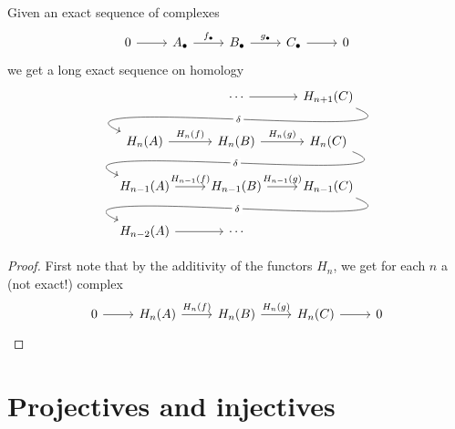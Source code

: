 \documentclass[main.tex]{subfiles}
\begin{document}
\begin{corollary}
  \label{cor:long_exact_sequence_on_homology}
  Given an exact sequence of complexes
  \begin{equation*}
    \begin{tikzcd}
      0
      \arrow[r]
      & A_{\bullet}
      \arrow[r, "f_{\bullet}"]
      & B_{\bullet}
      \arrow[r, "g_{\bullet}"]
      & C_{\bullet}
      \arrow[r]
      & 0
    \end{tikzcd}
  \end{equation*}
  we get a long exact sequence on homology
  \begin{equation*}
    \begin{tikzcd}
      & \cdots
      \arrow[r]
      & H_{n+1}(C)
      \\
      H_{n}(A)
      \arrow[from=urr, out=-22, in=157, looseness=1, overlay, "\delta" description]
      \arrow[r, "H_{n}(f)"]
      & H_{n}(B)
      \arrow[r, "H_{n}(g)"]
      & H_{n}(C)
      \\
      H_{n-1}(A)
      \arrow[from=urr, out=-22, in=157, looseness=1, overlay, "\delta" description]
      \arrow[r, "H_{n-1}(f)"]
      & H_{n-1}(B)
      \arrow[r, "H_{n-1}(g)"]
      & H_{n-1}(C)
      \\
      H_{n-2}(A)
      \arrow[from=urr, out=-22, in=157, looseness=1, overlay, "\delta" description]
      \arrow[r]
      & \cdots
    \end{tikzcd}
  \end{equation*}
\end{corollary}
\begin{proof}
  First note that by the additivity of the functors $H_{n}$, we get for each $n$ a (not exact!) complex
  \begin{equation*}
    \begin{tikzcd}
      0
      \arrow[r]
      & H_{n}(A)
      \arrow[r, "H_{n}(f)"]
      & H_{n}(B)
      \arrow[r, "H_{n}(g)"]
      & H_{n}(C)
      \arrow[r]
      & 0
    \end{tikzcd}
  \end{equation*}
\end{proof}

\section{Projectives and injectives}
\label{ssc:projectives_and_injectives}
\end{document}
